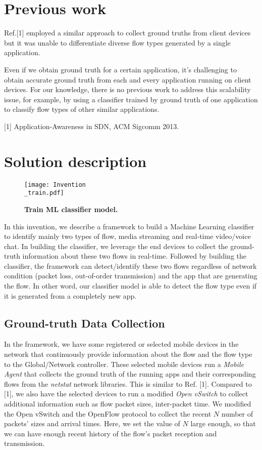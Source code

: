 \documentclass[12pt]{amsart}
\begin{document}
\section{Previous work}

Ref.[1] employed a similar approach to collect ground truths from client devices but it was unable to differentiate diverse flow types generated by a single application. 

Even if we obtain ground truth for a certain application, it's challenging to obtain accurate ground truth from each and every application running on client devices. For our knowledge, there is no previous work to address this scalability issue, for example, by using a classifier trained by ground truth of one application to classify flow types of other similar applications. 

[1] Application-Awareness in SDN, ACM Sigcomm 2013.

\section{Solution description}

\begin{figure*}
	\centering
	\texttt{[image: Invention\\\_train.pdf]}
	\caption{\textbf{Train ML classifier model.}} 
	\label{fig:system}
\end{figure*}

In this invention, we describe a framework to build a Machine Learning classifier to identify mainly two types of flow, media streaming and real-time video/voice chat. In building the classifier, we leverage the end devices to collect the ground-truth information about these two flows in real-time. Followed by building the classifier, the framework can detect/identify these two flows regardless of network condition (packet loss, out-of-order transmission) and the app that are generating the flow. In other word, our classifier model is able to detect the flow type even if it is generated from a completely new app. 

\subsection{Ground-truth Data Collection}
In the framework, we have some registered or selected mobile devices in the network that continuously provide information about the flow and the flow type to the Global/Network controller. These selected mobile devices run a \textit{Mobile Agent} that collects the ground truth of the running apps and their corresponding flows from the \textit{netstat} network libraries. This is similar to Ref. [1]. Compared to [1], we also have the selected devices to run a modified \textit{Open vSwitch} to collect additional information such as flow packet sizes, inter-packet time. We modified the Open vSwitch and the OpenFlow protocol to collect the recent $N$ number of packets' sizes and arrival times. Here, we set the value of $N$ large enough, so that we can have enough recent history of the flow's packet reception and transmission. 
\end{document}
